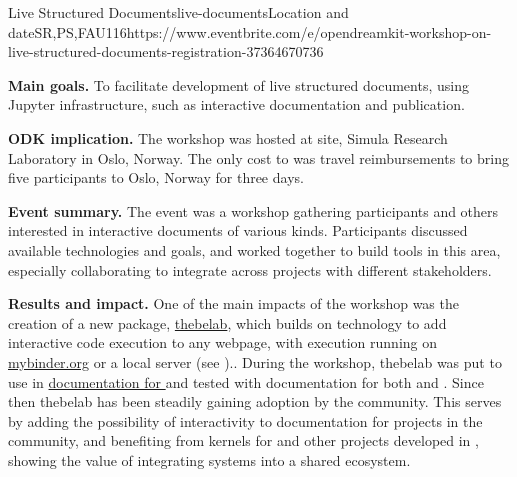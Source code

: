 \begin{event}{Live Structured Documents}{live-documents}{Location and date}{SR,PS,FAU}{11}{6}{https://www.eventbrite.com/e/opendreamkit-workshop-on-live-structured-documents-registration-37364670736}

\textbf{Main goals.} To facilitate development of live structured documents, using Jupyter infrastructure, such as interactive documentation and publication.

\textbf{ODK implication.}
The workshop was hosted at \ODK site, Simula Research Laboratory in Oslo, Norway. The only cost to \ODK was travel reimbursements to bring five participants to Oslo, Norway for three days.

\textbf{Event summary.} The event was a workshop gathering \ODK participants and others interested in interactive documents of various kinds.
Participants discussed available technologies and goals,
and worked together to build tools in this area,
especially collaborating to integrate across projects with different stakeholders.

\textbf{Results and impact.}
One of the main impacts of the workshop
was the creation of a new package, \href{https://github.com/minrk/thebelab}{thebelab},
which builds on \Jupyter technology
to add interactive code execution to any webpage,
with execution running on \href{https://mybinder.org}{mybinder.org} or a local \Jupyter server
(see )..
During the workshop, thebelab was put to use in \href{https://more-sagemath-tutorials.readthedocs.io/en/latest/}{documentation for
\Sage} and tested with documentation for both \Singular and \GAP.
Since then thebelab has been steadily gaining adoption by the community.
This serves  by adding the possibility of interactivity to documentation for projects in the \ODK community,
and benefiting from kernels for \GAP and other \ODK projects developed in ,
showing the value of integrating \ODK systems into a shared \Jupyter ecosystem.

\end{event}

